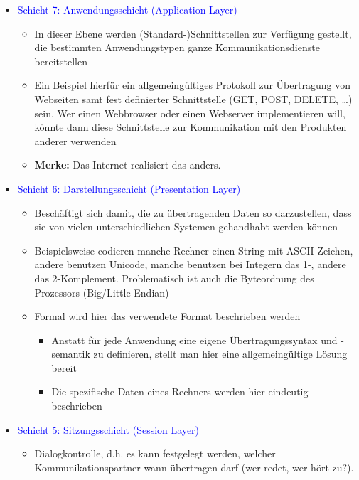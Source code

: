 \begin{itemize}
    \item \textcolor{blue}{Schicht 7: Anwendungsschicht (Application Layer)}
    \begin{itemize}
        \item In dieser Ebene werden (Standard-)Schnittstellen zur Verfügung gestellt, die bestimmten Anwendungstypen ganze Kommunikationsdienste bereitstellen
        \item Ein Beispiel hierfür ein allgemeingültiges Protokoll zur Übertragung von Webseiten samt fest definierter Schnittstelle (GET, POST, DELETE, …) sein. Wer einen Webbrowser oder einen Webserver implementieren will, könnte dann diese Schnittstelle zur Kommunikation mit den Produkten anderer verwenden
        \item \textbf{Merke:} Das Internet realisiert das anders.
    \end{itemize}
    \item \textcolor{blue}{Schicht 6: Darstellungsschicht (Presentation Layer)}
    \begin{itemize}
        \item Beschäftigt sich damit, die zu übertragenden Daten so darzustellen, dass sie von vielen unterschiedlichen Systemen gehandhabt werden können
        \item Beispielsweise codieren manche Rechner einen String mit ASCII-Zeichen, andere benutzen Unicode, manche benutzen bei Integern das 1-, andere das 2-Komplement. Problematisch ist auch die Byteordnung des Prozessors (Big/Little-Endian)
        \item Formal wird hier das verwendete Format beschrieben werden
        \begin{itemize}
            \item Anstatt für jede Anwendung eine eigene Übertragungssyntax und -semantik zu definieren,
            stellt man hier eine allgemeingültige Lösung bereit
            \item Die spezifische Daten eines Rechners werden hier eindeutig beschrieben
        \end{itemize}
    \end{itemize}
    \item \textcolor{blue}{Schicht 5: Sitzungsschicht (Session Layer)}
    \begin{itemize}
        \item Dialogkontrolle, d.h. es kann festgelegt werden, welcher Kommunikationspartner wann übertragen darf (wer redet, wer hört zu?).

\end{itemize}
\end{itemize}
